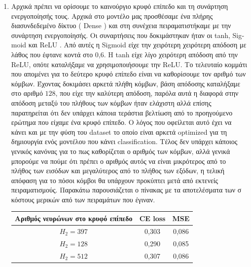 \documentclass[12pt,a4paper]{article}
\newcommand{\tl}{\textlatin}
\begin{document}
\begin{enumerate}[a]
        \item Αρχικά πρέπει να ορίσουμε το καινούργιο κρυφό επίπεδο και τη συνάρτηση ενεργοποίησής τους. Αρχικά στο μοντέλο μας προσθέσαμε ένα πλήρης διασυνδεδεμένο δίκτυο ( \tl{Dense} ) και στη συνέχεια πειραματιστήκαμε με την συνάρτηση ενεργοποίησής. Οι συναρτήσεις που δοκιμάστηκαν ήταν οι \tl{tanh, Sigmoid} και \tl{ReLU }. Από αυτές η \tl{Sigmoid} είχε την χειρότερη χειρότερη απόδοση με λάθος που έφτανε κοντά στο 0,6. Η \tl{tanh} είχε λίγο χειρότερη απόδοση από την \tl{ReLU}, οπότε καταλήξαμε να χρησιμοποιήσουμε την \tl{ReLU}. Το τελευταίο κομμάτι που απομένει για το δεύτερο κρυφό επίπεδο είναι να καθορίσουμε τον αριθμό των κόμβων. Έχοντας δοκιμάσει αρκετά πλήθη κόμβων, βάση απόδοσης καταλήξαμε στο αριθμό $128$, που είχε την καλύτερη απόδοση, παρόλα αυτά η διαφορά στην απόδοση μεταξύ του πλήθους των κόμβων ήταν ελάχιστη αλλά επίσης παρατηρείται ότι δεν υπάρχει κάποια τεράστια βελτίωση από το προηγούμενο ερώτημα που είχαμε ένα κρυφό επίπεδο. Ο λόγος που οφείλεται αυτό έχει να κάνει και με την φύση του \tl{dataset} το οποίο είναι αρκετά \tl{optimized} για τη δημιουργία ενός μοντέλου που κάνει \tl{classification}. Τέλος δεν υπάρχει κάποιος γενικός κανόνας για το πως καθορίζεται ο αριθμός των κόμβων, αλλά γενικά μπορούμε να πούμε ότι πρέπει ο αριθμός αυτός να είναι μικρότερος από το πλήθος των εισόδων και μεγαλύτερος από το πλήθος των εξόδων, η τελική απόφαση για το πόσοι κόμβοι θα υπάρχουν προκύπτει μετά από εκτενείς πειραματισμούς. Παρακάτω παρουσιάζεται ο πίνακας με τα αποτελέσματα των σ κόστους μερικών από των πειραμάτων που έγιναν. \\ 

            \begin{tabular}{|c | c | c | }
                \hline
                Αριθμός νευρώνων στο κρυφό επίπεδο & \tl{CE loss} & \tl{MSE} \\
                \hline
                $H_2 = 397$ & 0,303 & 0,086 \\ 
                $H_2 = 128$ & 0,290 & 0,085 \\ 
                $H_2 = 512$ & 0,307 & 0,086 \\
                \hline 
            \end{tabular} 
            \\


\end{enumerate}
\end{document}

